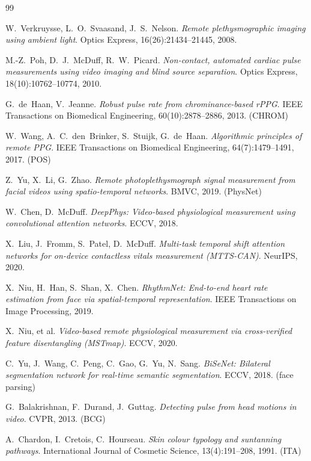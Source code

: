 \documentclass[11pt,a4paper]{article}
\begin{document}
\begin{thebibliography}{99}
\setlength{\itemsep}{2pt}

 W.~Verkruysse, L.~O.~Svaasand, J.~S.~Nelson.
\emph{Remote plethysmographic imaging using ambient light}. Optics Express,
16(26):21434--21445, 2008.

 M.-Z.~Poh, D.~J.~McDuff, R.~W.~Picard.
\emph{Non-contact, automated cardiac pulse measurements using video imaging and
blind source separation}. Optics Express, 18(10):10762--10774, 2010.

 G.~de~Haan, V.~Jeanne.
\emph{Robust pulse rate from chrominance-based rPPG}. IEEE Transactions on
Biomedical Engineering, 60(10):2878--2886, 2013. (CHROM)

 W.~Wang, A.~C.~den~Brinker, S.~Stuijk, G.~de~Haan.
\emph{Algorithmic principles of remote PPG}. IEEE Transactions on Biomedical
Engineering, 64(7):1479--1491, 2017. (POS)

 Z.~Yu, X.~Li, G.~Zhao.
\emph{Remote photoplethysmograph signal measurement from facial videos using
spatio-temporal networks}. BMVC, 2019. (PhysNet)

 W.~Chen, D.~McDuff.
\emph{DeepPhys: Video-based physiological measurement using convolutional
attention networks}. ECCV, 2018.

 X.~Liu, J.~Fromm, S.~Patel, D.~McDuff.
\emph{Multi-task temporal shift attention networks for on-device contactless
vitals measurement (MTTS-CAN)}. NeurIPS, 2020.

 X.~Niu, H.~Han, S.~Shan, X.~Chen.
\emph{RhythmNet: End-to-end heart rate estimation from face via spatial-temporal
representation}. IEEE Transactions on Image Processing, 2019.

 X.~Niu, et al.
\emph{Video-based remote physiological measurement via cross-verified feature
disentangling (MSTmap)}. ECCV, 2020.

 C.~Yu, J.~Wang, C.~Peng, C.~Gao, G.~Yu, N.~Sang.
\emph{BiSeNet: Bilateral segmentation network for real-time semantic
segmentation}. ECCV, 2018. (face parsing)

 G.~Balakrishnan, F.~Durand, J.~Guttag.
\emph{Detecting pulse from head motions in video}. CVPR, 2013. (BCG)

 A.~Chardon, I.~Cretois, C.~Hourseau.
\emph{Skin colour typology and suntanning pathways}. International Journal of
Cosmetic Science, 13(4):191--208, 1991. (ITA)


\end{thebibliography}
\end{document}
